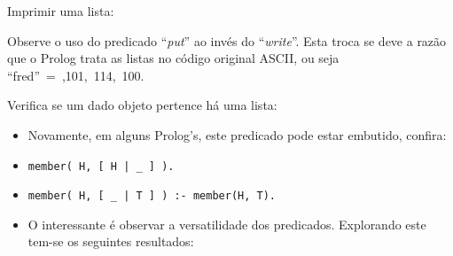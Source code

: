 \documentclass[sans]{beamer}
\begin{document}

\begin{frame}
\begin{block}{Imprimir uma lista:}

Observe o uso do predicado
 ``{\em put}'' ao invés do ``{\em write}''.
Esta troca se deve a razão que o Prolog trata as listas no código
original ASCII, ou seja \mbox{``fred'' = ,101, 114,
100\rbrack }.





\end{block}
\end{frame}


\begin{frame}
\begin{block}{Verifica se um dado objeto pertence há uma lista:}
\begin{itemize}
 \item Novamente, em alguns Prolog's, este predicado pode estar embutido, confira:
 \item \texttt{member( H, [ H |  \_ ] ).}
 \item \texttt{member( H, [ \_  | T ] ) :- member(H, T).}
 \item O interessante é observar a versatilidade dos predicados. Explorando este tem-se os seguintes resultados:
\end{itemize}
\end{block}
\end{frame}

\end{document}

